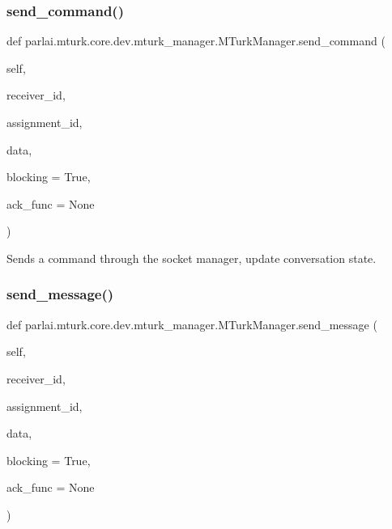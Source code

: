 \subsubsection{\texorpdfstring{send\+\_\+command()}{send\_command()}}
{\footnotesize\ttfamily def parlai.\+mturk.\+core.\+dev.\+mturk\+\_\+manager.\+M\+Turk\+Manager.\+send\+\_\+command (\begin{DoxyParamCaption}\item[{}]{self,  }\item[{}]{receiver\+\_\+id,  }\item[{}]{assignment\+\_\+id,  }\item[{}]{data,  }\item[{}]{blocking = {\ttfamily True},  }\item[{}]{ack\+\_\+func = {\ttfamily None} }\end{DoxyParamCaption})}

\begin{DoxyVerb}Sends a command through the socket manager, update conversation state.
\end{DoxyVerb}
 \mbox{\label{classparlai_1_1mturk_1_1core_1_1dev_1_1mturk__manager_1_1MTurkManager_a8462af5dea67437813f6eb44d67e2306}} 
\subsubsection{\texorpdfstring{send\+\_\+message()}{send\_message()}}
{\footnotesize\ttfamily def parlai.\+mturk.\+core.\+dev.\+mturk\+\_\+manager.\+M\+Turk\+Manager.\+send\+\_\+message (\begin{DoxyParamCaption}\item[{}]{self,  }\item[{}]{receiver\+\_\+id,  }\item[{}]{assignment\+\_\+id,  }\item[{}]{data,  }\item[{}]{blocking = {\ttfamily True},  }\item[{}]{ack\+\_\+func = {\ttfamily None} }\end{DoxyParamCaption})}

